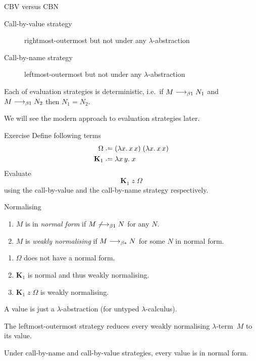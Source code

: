 \begin{frame}{CBV versus CBN}
\begin{description}
  \item[Call-by-value strategy]
    rightmost-outermost but not under any $\lambda$-abstraction
  \item[Call-by-name strategy]
    leftmost-outermost but not under any $\lambda$-abstraction
\end{description}

\begin{proposition}[Determinacy]
  Each of evaluation strategies is deterministic, i.e.\ 
  if $M \longrightarrow_{\beta1} N_1$ and $M \longrightarrow_{\beta1} N_2$ then $N_1 = N_2$.
\end{proposition}
We will see the modern approach to evaluation strategies later.
\end{frame}

\begin{frame}{Exercise}
  Define following terms
\begin{align*}
  \Omega &\defeq (\lambda x.\, x\,x)\;(\lambda x.\,x\,x) \\
  \mathbf{K}_1 & \defeq \lambda x\,y.\;x
\end{align*}
Evaluate 
\[
  \mathbf{K}_1\;z\;\Omega
\]
using the call-by-value and the call-by-name strategy respectively.
\end{frame}

\begin{frame}[allowframebreaks]{Normalising}
\begin{definition}
  \begin{enumerate}
    \item $M$ is in \emph{normal form} if $M \not\longrightarrow_{\beta1} N$ for any $N$. 
    \item $M$ is \emph{weakly normalising} if $M \longrightarrow_{\beta*} N$ for some $N$ in
      normal form.
  \end{enumerate}
\end{definition}
%
  \begin{enumerate}
    \item $\Omega$ does not have a normal form.
    \item $\mathbf{K}_1$ is normal and thus weakly normalising.
    \item $\mathbf{K}_1\;z\; \Omega$ is weakly normalising.
  \end{enumerate}

\begin{definition}
  A \alert{value} is just a $\lambda$-abstraction (for untyped $\lambda$-calculus). 
\end{definition}

\begin{theorem}%
  The leftmost-outermost strategy reduces every weakly
  normalising $\lambda$-term~$M$ to its value.
\end{theorem}

\begin{proposition}
  Under call-by-name and call-by-value strategies, 
  every value is in normal form.
\end{proposition}
\end{frame}

